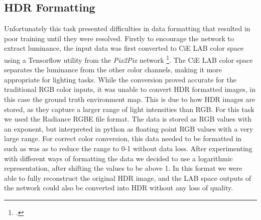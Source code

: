 \documentclass[ %
                    author={Gavin Parker},
                supervisor={Dr. Neill Campbell},
                    degree={MEng},
                     title={Deep Learning for Illumination Estimation from Stereo Images},
                  subtitle={},
                      type={Research},
                      year={2018} ]{dissertation}
\begin{document}
\subsection{HDR Formatting}
Unfortunately this task presented difficulties in data formatting that resulted in poor training until they were resolved. Firstly to encourage the network to extract luminance, the input data was first converted to CiE LAB color space using a Tensorflow utility from the \textit{Pix2Pix} network \footcite{https://github.com/affinelayer/pix2pix-tensorflow/blob/master/pix2pix.py}. The CiE LAB color space separates the luminance from the other color channels, making it more appropriate for lighting tasks. While the conversion proved accurate for the traditional RGB color inputs, it was unable to convert HDR formatted images, in this case the ground truth environment map. This is due to how HDR images are stored, as they capture a larger range of light intensities than RGB. For this task we used the Radiance RGBE file format. The data is stored as RGB values with an exponent, but interpreted in python as floating point RGB values with a very large range. For correct color conversion, this data needed to be formatted in such as was as to reduce the range to 0-1 without data loss. After experimenting with different ways of formatting the data we decided to use a logarithmic representation, after shifting the values to be above 1. In this format we were able to fully reconstruct the original HDR image, and the LAB space outputs of the network could also be converted into HDR without any loss of quality.
\end{document}
